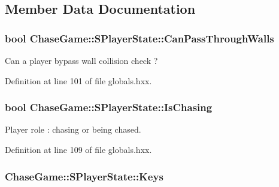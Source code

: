 \subsection{Member Data Documentation}
\hypertarget{struct_chase_game_1_1_s_player_state_acd7030969c414605901e551171078bb1}{
\subsubsection[{Can\-Pass\-Through\-Walls}]{\setlength{\rightskip}{0pt plus 5cm}bool Chase\-Game\-::\-S\-Player\-State\-::\-Can\-Pass\-Through\-Walls}}\label{struct_chase_game_1_1_s_player_state_acd7030969c414605901e551171078bb1}


Can a player bypass wall collision check ? 



Definition at line 101 of file globals.\-hxx.

\hypertarget{struct_chase_game_1_1_s_player_state_a2574de666d4744daefd7824b1c3c809f}{
\subsubsection[{Is\-Chasing}]{\setlength{\rightskip}{0pt plus 5cm}bool Chase\-Game\-::\-S\-Player\-State\-::\-Is\-Chasing}}\label{struct_chase_game_1_1_s_player_state_a2574de666d4744daefd7824b1c3c809f}


Player role \-: chasing or being chased. 



Definition at line 109 of file globals.\-hxx.

\hypertarget{struct_chase_game_1_1_s_player_state_a3fc9ce0322ed28ff9c401983d91c69f2}{
\subsubsection[{Keys}]{ Chase\-Game\-::\-S\-Player\-State\-::\-Keys}}\label{struct_chase_game_1_1_s_player_state_a3fc9ce0322ed28ff9c401983d91c69f2}



